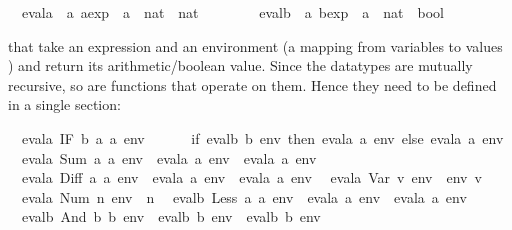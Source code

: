 \begin{isabellebody}
\begin{isamarkuptext}
\end{isamarkuptext}%
\ \ evala\ {\isacharcolon}{\isacharcolon}\ {\isachardoublequote}{\isacharprime}a\ aexp\ {\isasymRightarrow}\ {\isacharparenleft}{\isacharprime}a\ {\isasymRightarrow}\ nat{\isacharparenright}\ {\isasymRightarrow}\ nat{\isachardoublequote}\isanewline
\ \ \ \ \ \ \ \ evalb\ {\isacharcolon}{\isacharcolon}\ {\isachardoublequote}{\isacharprime}a\ bexp\ {\isasymRightarrow}\ {\isacharparenleft}{\isacharprime}a\ {\isasymRightarrow}\ nat{\isacharparenright}\ {\isasymRightarrow}\ bool{\isachardoublequote}%
\begin{isamarkuptext}%
\noindent
that take an expression and an environment (a mapping from variables  to values
) and return its arithmetic/boolean
value. Since the datatypes are mutually recursive, so are functions that
operate on them. Hence they need to be defined in a single 
section:%
\end{isamarkuptext}%
\isanewline
\ \ {\isachardoublequote}evala\ {\isacharparenleft}IF\ b\ a\ a\ env\ {\isacharequal}\isanewline
\ \ \ \ \ {\isacharparenleft}if\ evalb\ b\ env\ then\ evala\ a\ env\ else\ evala\ a\ env{\isacharparenright}{\isachardoublequote}\isanewline
\ \ {\isachardoublequote}evala\ {\isacharparenleft}Sum\ a\ a\ env\ {\isacharequal}\ evala\ a\ env\ {\isacharplus}\ evala\ a\ env{\isachardoublequote}\isanewline
\ \ {\isachardoublequote}evala\ {\isacharparenleft}Diff\ a\ a\ env\ {\isacharequal}\ evala\ a\ env\ {\isacharminus}\ evala\ a\ env{\isachardoublequote}\isanewline
\ \ {\isachardoublequote}evala\ {\isacharparenleft}Var\ v{\isacharparenright}\ env\ {\isacharequal}\ env\ v{\isachardoublequote}\isanewline
\ \ {\isachardoublequote}evala\ {\isacharparenleft}Num\ n{\isacharparenright}\ env\ {\isacharequal}\ n{\isachardoublequote}\isanewline
\isanewline
\ \ {\isachardoublequote}evalb\ {\isacharparenleft}Less\ a\ a\ env\ {\isacharequal}\ {\isacharparenleft}evala\ a\ env\ {\isacharless}\ evala\ a\ env{\isacharparenright}{\isachardoublequote}\isanewline
\ \ {\isachardoublequote}evalb\ {\isacharparenleft}And\ b\ b\ env\ {\isacharequal}\ {\isacharparenleft}evalb\ b\ env\ {\isasymand}\ evalb\ b\ env{\isacharparenright}{\isachardoublequote}\isanewline

\end{isabellebody}
